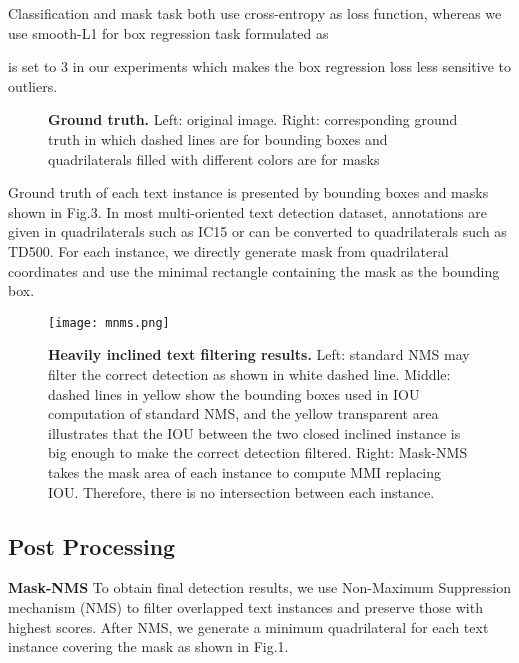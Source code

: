 \documentclass[a4paper,conference]{IEEEtran}
\begin{document}
Classification and mask task both use cross-entropy as loss function, whereas we use smooth-L1 for box regression task formulated as 




 is set to 3 in our experiments which makes the box regression loss less sensitive to outliers. 

\begin{figure}
  \centering
  \hspace{0.1in}
  \caption{\textbf{Ground truth.} Left: original image. Right: corresponding ground truth in which dashed lines are for bounding boxes and quadrilaterals filled with different colors are for masks}
  \label{fig:subfig} \end{figure} 
Ground truth of each text instance is presented by bounding boxes and masks shown in Fig.3. In most multi-oriented text detection dataset, annotations are given in quadrilaterals such as IC15 or can be converted to quadrilaterals such as TD500. For each instance, we directly generate mask from quadrilateral coordinates and use the minimal rectangle containing the mask as the bounding box.
\begin{figure}[h]
\begin{center}
  
\texttt{[image: mnms.png]}
\caption{\textbf{Heavily inclined text filtering results.} Left: standard NMS may filter the correct detection as shown in white dashed line. Middle: dashed lines in yellow show the bounding boxes used in IOU computation of standard NMS, and the yellow transparent area illustrates that the IOU between the two closed inclined instance is big enough to make the correct detection filtered. Right: Mask-NMS takes the mask area of each instance to compute MMI replacing IOU. Therefore, there is no intersection between each instance. } 

\end{center}
\end{figure}






\subsection{Post Processing}
\textbf{Mask-NMS} To obtain final detection results, we use Non-Maximum Suppression mechanism (NMS) to filter overlapped text instances and preserve those with highest scores. After NMS, we generate a minimum quadrilateral for each text instance covering the mask as shown in Fig.1. 
\end{document}
